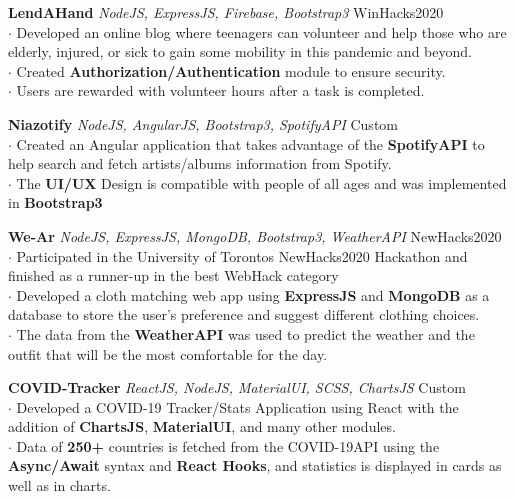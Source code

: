 \documentclass[a4paper]{article}
\begin{document}
{\textbf{LendAHand}} {\sl NodeJS, ExpressJS, Firebase, Bootstrap3} \hfill WinHacks2020\\
$\cdot$ Developed an online blog where teenagers can volunteer and help those who are elderly, injured, or sick to gain some mobility in this pandemic and beyond.\\
$\cdot$ Created {\textbf{Authorization/Authentication}} module to ensure security.\\
$\cdot$ Users are rewarded with volunteer hours after a task is completed.\\
\vspace*{2mm}

{\textbf{Niazotify}} {\sl NodeJS, AngularJS, Bootstrap3, SpotifyAPI} \hfill Custom\\
$\cdot$ Created an Angular application that takes advantage of the {\textbf{SpotifyAPI}} to help search and fetch artists/albums information from Spotify.\\  $\cdot$ The {\textbf{UI/UX}} Design is compatible with people of all ages and was implemented in {\textbf{Bootstrap3}} \\
\vspace*{2mm}

{\textbf{We-Ar}} {\sl NodeJS, ExpressJS, MongoDB, Bootstrap3, WeatherAPI} \hfill NewHacks2020\\
$\cdot$ Participated in the University of Torontos NewHacks2020 Hackathon and finished as a runner-up in
the best WebHack category\\
$\cdot$ Developed a cloth matching web app using {\textbf{ExpressJS}} and {\textbf{MongoDB}} as a database to store the user's preference and suggest different clothing choices.\\
$\cdot$ The data from the {\textbf{WeatherAPI}} was used to predict the weather and the outfit that will be the most comfortable for the day.\\

\vspace*{2mm}

{\textbf{COVID-Tracker}} {\sl ReactJS, NodeJS, MaterialUI, SCSS, ChartsJS} \hfill Custom\\
$\cdot$ Developed a COVID-19 Tracker/Stats Application using React with the addition of {\textbf{ChartsJS}}, {\textbf{MaterialUI}}, and many other modules.\\ $\cdot$ Data of {\textbf{250+}} countries is fetched from the COVID-19API using the {\textbf{Async/Await}} syntax and {\textbf{React Hooks}}, and statistics is displayed in cards as well as in charts.\\
\vspace*{2mm}
\end{document}
